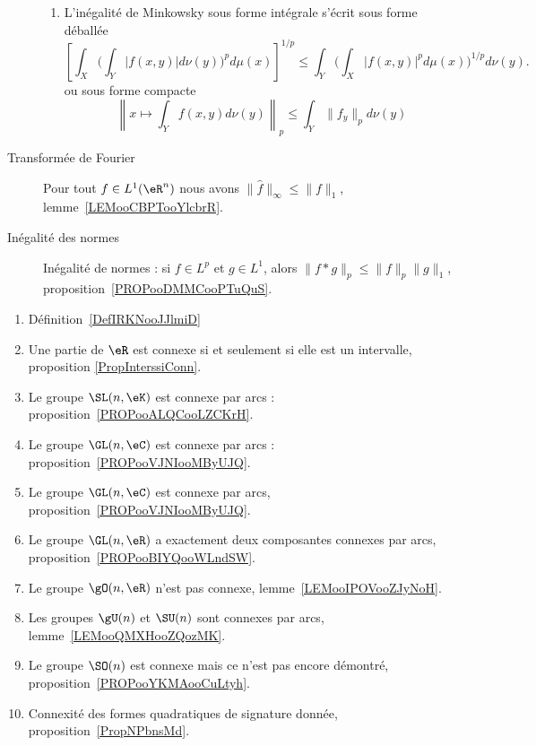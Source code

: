 \begin{description}
\begin{enumerate}
            \item
                L'inégalité de Minkowsky sous forme intégrale s'écrit sous forme déballée
                \begin{equation*}
                    \left[ \int_X\Big( \int_Y| f(x,y) |d\nu(y) \Big)^pd\mu(x) \right]^{1/p}\leq \int_Y\Big( \int_X| f(x,y) |^pd\mu(x) \Big)^{1/p}d\nu(y).
                \end{equation*}
                ou sous forme compacte
                \begin{equation*}
                    \left\|   x\mapsto\int_Y f(x,y)d\nu(y)   \right\|_p\leq \int_Y  \| f_y \|_pd\nu(y)
                \end{equation*}
        \end{enumerate}
    \item[Transformée de Fourier]
                Pour tout \( f\in L^1(\eR^n)\) nous avons \( \| \hat f \|_{\infty}\leq \| f \|_1\), lemme~\ref{LEMooCBPTooYlcbrR}.
    \item[Inégalité des normes]
        Inégalité de normes : si \( f\in L^p\) et \( g\in L^1\), alors \( \| f*g \|_p\leq \| f \|_p\| g \|_1\), proposition~\ref{PROPooDMMCooPTuQuS}.

\end{description}


    \begin{enumerate}
        \item
            Définition~\ref{DefIRKNooJJlmiD}
        \item
            Une partie de \( \eR\) est connexe si et seulement si elle est un intervalle, proposition \ref{PropInterssiConn}.
        \item
            Le groupe \( \SL(n,\eK)\) est connexe par arcs : proposition~\ref{PROPooALQCooLZCKrH}.
        \item
            Le groupe \( \GL(n,\eC)\) est connexe par arcs : proposition~\ref{PROPooVJNIooMByUJQ}.
        \item
            Le groupe \( \GL(n,\eC)\) est connexe par arcs, proposition~\ref{PROPooVJNIooMByUJQ}.
        \item
            Le groupe \( \GL(n,\eR)\) a exactement deux composantes connexes par arcs, proposition~\ref{PROPooBIYQooWLndSW}.
        \item
            Le groupe \( \gO(n,\eR)\) n'est pas connexe, lemme~\ref{LEMooIPOVooZJyNoH}.
        \item
            Les groupes \( \gU(n)\) et \( \SU(n)\) sont connexes par arcs, lemme~\ref{LEMooQMXHooZQozMK}.
        \item
            Le groupe \( \SO(n)\) est connexe mais ce n'est pas encore démontré, proposition~\ref{PROPooYKMAooCuLtyh}.
        \item
            Connexité des formes quadratiques de signature donnée, proposition~\ref{PropNPbnsMd}.
        \end{enumerate}

